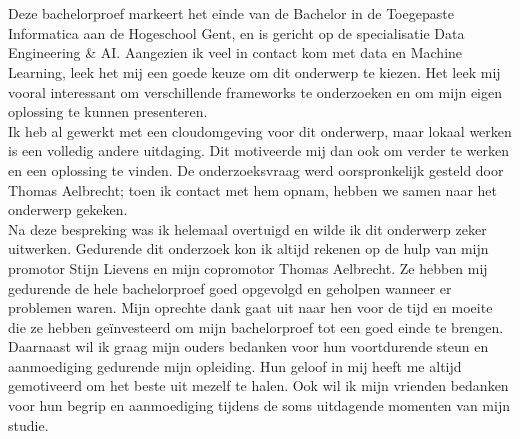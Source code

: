 
\chapter*{}%
\label{ch:voorwoord}
Deze bachelorproef markeert het einde van de Bachelor in de Toegepaste Informatica aan de Hogeschool Gent, en is gericht op de specialisatie Data Engineering \& AI. Aangezien ik veel in contact kom met data en Machine Learning, leek het mij een goede keuze om dit onderwerp te kiezen. Het leek mij vooral interessant om verschillende frameworks te onderzoeken en om mijn eigen oplossing te kunnen presenteren.\\

Ik heb al gewerkt met een cloudomgeving voor dit onderwerp, maar lokaal werken is een volledig andere uitdaging. Dit motiveerde mij dan ook om verder te werken en een oplossing te vinden. De onderzoeksvraag werd oorspronkelijk gesteld door Thomas Aelbrecht; toen ik contact met hem opnam, hebben we samen naar het onderwerp gekeken.\\

Na deze bespreking was ik helemaal overtuigd en wilde ik dit onderwerp zeker uitwerken. Gedurende dit onderzoek kon ik altijd rekenen op de hulp van mijn promotor Stijn Lievens en mijn copromotor Thomas Aelbrecht. Ze hebben mij gedurende de hele bachelorproef goed opgevolgd en geholpen wanneer er problemen waren. Mijn oprechte dank gaat uit naar hen voor de tijd en moeite die ze hebben geïnvesteerd om mijn bachelorproef tot een goed einde te brengen.\\

Daarnaast wil ik graag mijn ouders bedanken voor hun voortdurende steun en aanmoediging gedurende mijn opleiding. Hun geloof in mij heeft me altijd gemotiveerd om het beste uit mezelf te halen. Ook wil ik mijn vrienden bedanken voor hun begrip en aanmoediging tijdens de soms uitdagende momenten van mijn studie.

